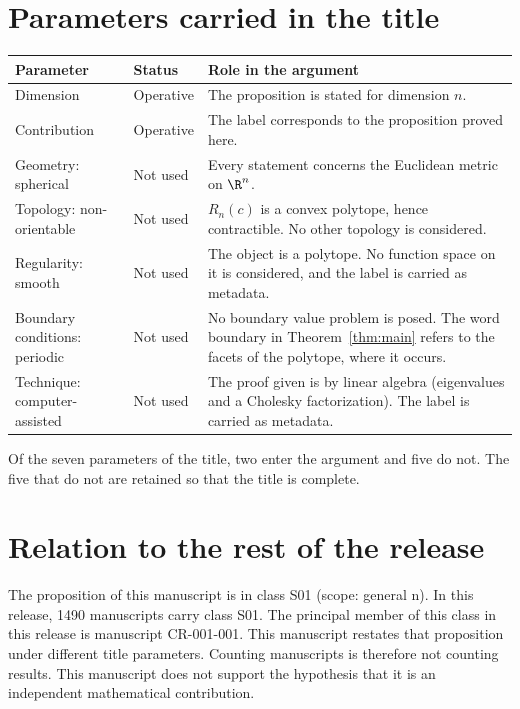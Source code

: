 \documentclass[11pt]{article}
\begin{document}
\section{Parameters carried in the title}\label{sec:params}
\begin{center}
\small
\begin{tabular}{p{}p{}p{}}
\toprule
Parameter & Status & Role in the argument \\
\midrule
Dimension & Operative & The proposition is stated for dimension $n$. \\
Contribution & Operative & The label corresponds to the proposition proved here. \\
Geometry: spherical & Not used & Every statement concerns the Euclidean metric on $\R^n$. \\
Topology: non-orientable & Not used & $R_n(c)$ is a convex polytope, hence contractible. No other topology is considered. \\
Regularity: smooth & Not used & The object is a polytope. No function space on it is considered, and the label is carried as metadata. \\
Boundary conditions: periodic & Not used & No boundary value problem is posed. The word boundary in Theorem~\ref{thm:main} refers to the facets of the polytope, where it occurs. \\
Technique: computer-assisted & Not used & The proof given is by linear algebra (eigenvalues and a Cholesky factorization). The label is carried as metadata. \\
\bottomrule
\end{tabular}
\end{center}
Of the seven parameters of the title, two enter the argument and five do not. The five that do not are retained so that the title is complete.

\section{Relation to the rest of the release}
The proposition of this manuscript is in class S01 (scope: general n).
In this release, 1490 manuscripts carry class S01. The principal member of this class in this release is manuscript CR-001-001. This manuscript restates that proposition under different title parameters.
Counting manuscripts is therefore not counting results. This manuscript does not support the hypothesis that it is an independent mathematical contribution.
\end{document}
